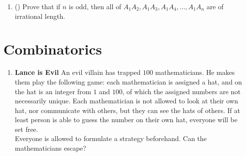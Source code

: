 \documentclass[11pt]{scrartcl}
\begin{document}
\begin{enumerate}[label=\textbf{A\arabic*}.]
\begin{enumerate}
        \item (\fullchili) Prove that if $n$ is odd, then all of $A_1A_2, A_1A_3, A_1A_4, \dots, A_1A_n$ are of irrational length.
    \end{enumerate}
    
\end{enumerate}

\clearpage
\section{Combinatorics}
\begin{enumerate}[label=\textbf{C\arabic*}.]
    \item \textbf{Lance is Evil} \newline
    An evil villain has trapped $100$ mathematicians. He makes them play the following game: each mathematician is assigned a hat, and on the hat is an integer from $1$ and $100$, of which the assigned numbers are not necessarily unique. \newline
    Each mathematician is not allowed to look at their own hat, nor communicate with others, but they can see the hats of others. If at least person is able to guess the number on their own hat, everyone will be set free.\\
    Everyone is allowed to formulate a strategy beforehand. Can the mathematicians escape?
\end{enumerate}

\newpage
\end{document}
